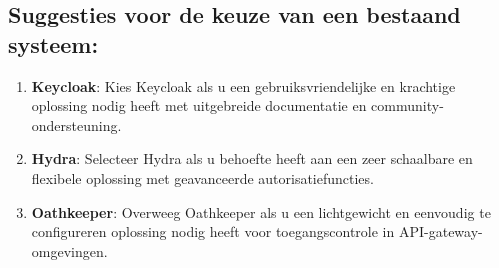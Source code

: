 \subsection{Suggesties voor de keuze van een bestaand systeem:}%
\label{subsec:suggesties-voor-de-keuze-van-een-bestaand-systeem}
\begin{enumerate}[label=\arabic*.]
    \item \textbf{Keycloak}: Kies Keycloak als u een gebruiksvriendelijke en krachtige oplossing nodig heeft met uitgebreide documentatie en community-ondersteuning.
    \item \textbf{Hydra}: Selecteer Hydra als u behoefte heeft aan een zeer schaalbare en flexibele oplossing met geavanceerde autorisatiefuncties.
    \item \textbf{Oathkeeper}: Overweeg Oathkeeper als u een lichtgewicht en eenvoudig te configureren oplossing nodig heeft voor toegangscontrole in API-gateway-omgevingen.
\end{enumerate}